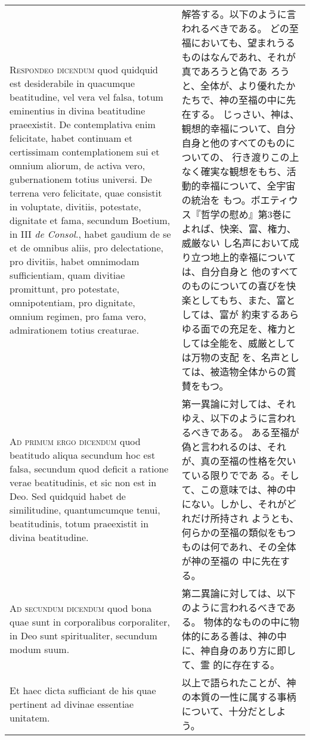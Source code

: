 \documentclass[10pt]{jsarticle} %
\begin{document}
\begin{longtable}{p{21em}p{21em}}
{\scshape Respondeo dicendum} quod quidquid est desiderabile in quacumque
beatitudine, vel vera vel falsa, totum eminentius in divina beatitudine
praeexistit. De contemplativa enim felicitate, habet continuam et
certissimam contemplationem sui et omnium aliorum, de activa vero,
gubernationem totius universi. De terrena vero felicitate, quae
consistit in voluptate, divitiis, potestate, dignitate et fama, secundum
Boetium, in III {\itshape de Consol}., habet gaudium de se et de omnibus aliis, pro
delectatione, pro divitiis, habet omnimodam sufficientiam, quam divitiae
promittunt, pro potestate, omnipotentiam, pro dignitate, omnium regimen,
pro fama vero, admirationem totius creaturae.


&

解答する。以下のように言われるべきである。
どの至福においても、望まれうるものはなんであれ、それが真であろうと偽であ
 ろうと、全体が、より優れたかたちで、神の至福の中に先在する。
じっさい、神は、観想的幸福について、自分自身と他のすべてのものについての、
 行き渡りこの上なく確実な観想をもち、活動的幸福について、全宇宙の統治を
 もつ。ボエティウス『哲学の慰め』第3巻によれば、快楽、富、権力、威厳ない
 し名声において成り立つ地上的幸福については、自分自身と
 他のすべてのものについての喜びを快楽としてもち、また、富としては、富が
約束するあらゆる面での充足を、権力としては全能を、威厳としては万物の支配
 を、名声としては、被造物全体からの賞賛をもつ。


\\



{\scshape Ad primum ergo dicendum} quod beatitudo aliqua secundum hoc est falsa,
secundum quod deficit a ratione verae beatitudinis, et sic non est in
Deo. Sed quidquid habet de similitudine, quantumcumque tenui,
beatitudinis, totum praeexistit in divina beatitudine.


&


第一異論に対しては、それゆえ、以下のように言われるべきである。
ある至福が偽と言われるのは、それが、真の至福の性格を欠いている限りでであ
 る。そして、この意味では、神の中にない。しかし、それがどれだけ所持され
 ようとも、何らかの至福の類似をもつものは何であれ、その全体が神の至福の
 中に先在する。



\\



{\scshape Ad secundum dicendum} quod bona quae sunt in corporalibus corporaliter,
in Deo sunt spiritualiter, secundum modum suum. 

&

第二異論に対しては、以下のように言われるべきである。
物体的なものの中に物体的にある善は、神の中に、神自身のあり方に即して、霊
 的に存在する。

\\

Et haec dicta sufficiant
de his quae pertinent ad divinae essentiae unitatem.


&

以上で語られたことが、神の本質の一性に属する事柄について、十分だとしよう。



\end{longtable}
\end{document}
